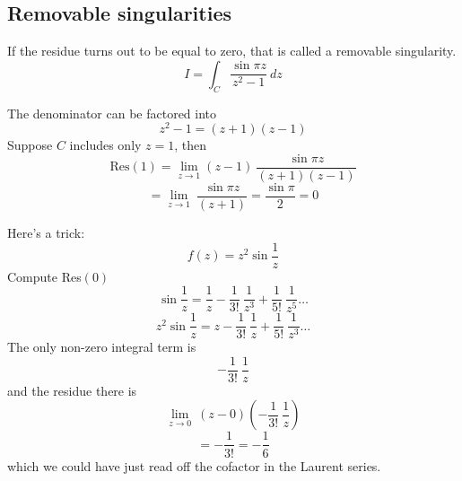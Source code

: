 \documentclass[11pt, oneside]{article}
\begin{document}
\subsection*{Removable singularities}
If the residue turns out to be equal to zero, that is called a removable singularity.  
\[ I = \int_C \frac{\sin \pi z}{z^2 - 1} \ dz \]

The denominator can be factored into 
\[ z^2 - 1 = (z + 1)(z - 1) \]
Suppose $C$ includes only $z = 1$, then
\[ \text{Res}(1) = \lim_{z \rightarrow 1}  (z-1) \ \frac{\sin \pi z}{(z + 1)(z - 1)} \]
\[ = \lim_{z \rightarrow 1} \ \frac{\sin \pi z}{(z + 1)} = \frac{\sin \pi}{2} =  0 \]

Here's a trick:
\[ f(z) = z^2 \sin \frac{1}{z} \]
Compute Res$(0)$
\[ \sin \frac{1}{z} = \frac{1}{z} - \frac{1}{3!} \ \frac{1}{z^3} + \frac{1}{5!} \ \frac{1}{z^5} \dots \]
\[ z^2 \sin \frac{1}{z} = z - \frac{1}{3!} \ \frac{1}{z} + \frac{1}{5!} \ \frac{1}{z^3} \dots \]
The only non-zero integral term is 
\[ - \frac{1}{3!} \ \frac{1}{z} \]
and the residue there is
\[ \lim_{z \rightarrow 0} \ (z - 0) (- \frac{1}{3!} \ \frac{1}{z}) \]
\[ = - \frac{1}{3!} = - \frac{1}{6} \]
which we could have just read off the cofactor in the Laurent series.
\end{document}
